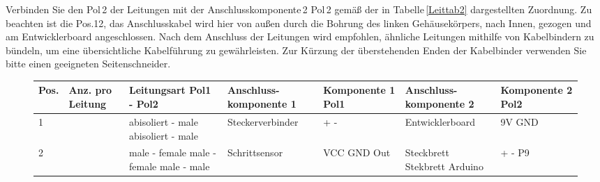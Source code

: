 Verbinden Sie den Pol 2 der Leitungen mit der Anschlusskomponente 2 Pol 2 gemäß der in Tabelle \ref{Leittab2} dargestellten Zuordnung. Zu beachten ist die Pos.12, das Anschlusskabel wird hier von außen durch die Bohrung des linken Gehäusekörpers, nach Innen, gezogen und am Entwicklerboard angeschlossen. 
Nach dem Anschluss der Leitungen wird empfohlen, ähnliche Leitungen mithilfe von Kabelbindern zu bündeln, um eine übersichtliche Kabelführung zu gewährleisten. Zur Kürzung der überstehenden Enden der Kabelbinder verwenden Sie bitte einen geeigneten Seitenschneider.

\begin{figure}[H]
	\begin{center}
		\fontsize{8}{10}\selectfont
		\begin{tabularx}{\textwidth}{|p{0.5cm}|p{1cm}|p{2.5cm}|p{2cm}|p{2cm}|p{2cm}|p{2cm}|} 
			\hline 
			\textbf{\newline Pos.} &  \textbf{\newline Anz. pro Leitung} &  \textbf{\newline Leitungsart \newline Pol1 - Pol2} &  \textbf{\newline Anschluss- \newline komponente 1} &  \textbf{\newline Komponente 1 Pol1} & \textbf{\newline Anschluss- \newline komponente 2} &  \textbf{\newline Komponente 2 Pol2} \\ \hline
			1 & \newline 1  & \newline abisoliert - male \newline abisoliert - male & Steckerverbinder  & \newline + \newline - & Entwicklerboard & \newline 9V \newline GND \\ \hline
			2 & \newline 2  & \newline male - female \newline male - female \newline male - male & Schrittsensor & \newline VCC \newline GND \newline Out & \newline Steckbrett \newline Stekbrett \newline Arduino & \newline + \newline - \newline P9 \\ \hline

\end{tabularx}
\end{center}
\end{figure}

